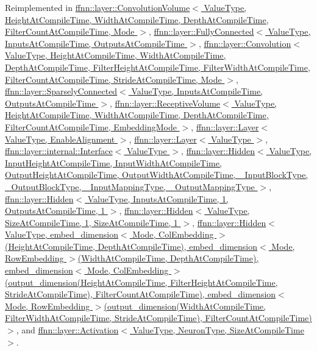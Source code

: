 Reimplemented in \hyperlink{classffnn_1_1layer_1_1_convolution_volume_a52d21f4ee6b841d154b1dc63bd3ed4bf}{ffnn\-::layer\-::\-Convolution\-Volume$<$ Value\-Type, Height\-At\-Compile\-Time, Width\-At\-Compile\-Time, Depth\-At\-Compile\-Time, Filter\-Count\-At\-Compile\-Time, Mode $>$}, \hyperlink{classffnn_1_1layer_1_1_fully_connected_a858f04f0752096d74e4d9876edb4c73e}{ffnn\-::layer\-::\-Fully\-Connected$<$ Value\-Type, Inputs\-At\-Compile\-Time, Outputs\-At\-Compile\-Time $>$}, \hyperlink{classffnn_1_1layer_1_1_convolution_a73b3701a644fe0ff1dad7c270fbf8ac6}{ffnn\-::layer\-::\-Convolution$<$ Value\-Type, Height\-At\-Compile\-Time, Width\-At\-Compile\-Time, Depth\-At\-Compile\-Time, Filter\-Height\-At\-Compile\-Time, Filter\-Width\-At\-Compile\-Time, Filter\-Count\-At\-Compile\-Time, Stride\-At\-Compile\-Time, Mode $>$}, \hyperlink{classffnn_1_1layer_1_1_sparsely_connected_aa8ae358e7cf06b58f3d33be2851d0260}{ffnn\-::layer\-::\-Sparsely\-Connected$<$ Value\-Type, Inputs\-At\-Compile\-Time, Outputs\-At\-Compile\-Time $>$}, \hyperlink{classffnn_1_1layer_1_1_receptive_volume_a9f813e0c5c60d572a296b8ec1fc25086}{ffnn\-::layer\-::\-Receptive\-Volume$<$ Value\-Type, Height\-At\-Compile\-Time, Width\-At\-Compile\-Time, Depth\-At\-Compile\-Time, Filter\-Count\-At\-Compile\-Time, Embedding\-Mode $>$}, \hyperlink{classffnn_1_1layer_1_1_layer_a5091f6ccef4d80254dd8caf72d13d136}{ffnn\-::layer\-::\-Layer$<$ Value\-Type, Enable\-Alignment $>$}, \hyperlink{classffnn_1_1layer_1_1_layer_a5091f6ccef4d80254dd8caf72d13d136}{ffnn\-::layer\-::\-Layer$<$ Value\-Type $>$}, \hyperlink{classffnn_1_1layer_1_1internal_1_1_interface_a417d6fda112fdffed8091b0ebd78ed97}{ffnn\-::layer\-::internal\-::\-Interface$<$ Value\-Type $>$}, \hyperlink{classffnn_1_1layer_1_1_hidden_a98305185267a0f7953f1b53c4bce4cf6}{ffnn\-::layer\-::\-Hidden$<$ Value\-Type, Input\-Height\-At\-Compile\-Time, Input\-Width\-At\-Compile\-Time, Output\-Height\-At\-Compile\-Time, Output\-Width\-At\-Compile\-Time, \-\_\-\-Input\-Block\-Type, \-\_\-\-Output\-Block\-Type, \-\_\-\-Input\-Mapping\-Type, \-\_\-\-Output\-Mapping\-Type $>$}, \hyperlink{classffnn_1_1layer_1_1_hidden_a98305185267a0f7953f1b53c4bce4cf6}{ffnn\-::layer\-::\-Hidden$<$ Value\-Type, Inputs\-At\-Compile\-Time, 1, Outputs\-At\-Compile\-Time, 1 $>$}, \hyperlink{classffnn_1_1layer_1_1_hidden_a98305185267a0f7953f1b53c4bce4cf6}{ffnn\-::layer\-::\-Hidden$<$ Value\-Type, Size\-At\-Compile\-Time, 1, Size\-At\-Compile\-Time, 1 $>$}, \hyperlink{classffnn_1_1layer_1_1_hidden_a98305185267a0f7953f1b53c4bce4cf6}{ffnn\-::layer\-::\-Hidden$<$ Value\-Type, embed\-\_\-dimension$<$ Mode, Col\-Embedding $>$(\-Height\-At\-Compile\-Time, Depth\-At\-Compile\-Time), embed\-\_\-dimension$<$ Mode, Row\-Embedding $>$(\-Width\-At\-Compile\-Time, Depth\-At\-Compile\-Time), embed\-\_\-dimension$<$ Mode, Col\-Embedding $>$(output\-\_\-dimension(\-Height\-At\-Compile\-Time, Filter\-Height\-At\-Compile\-Time, Stride\-At\-Compile\-Time), Filter\-Count\-At\-Compile\-Time), embed\-\_\-dimension$<$ Mode, Row\-Embedding $>$(output\-\_\-dimension(\-Width\-At\-Compile\-Time, Filter\-Width\-At\-Compile\-Time, Stride\-At\-Compile\-Time), Filter\-Count\-At\-Compile\-Time)$>$}, and \hyperlink{classffnn_1_1layer_1_1_activation_ab5525e49c08fc593856b9c95e0eba1ee}{ffnn\-::layer\-::\-Activation$<$ Value\-Type, Neuron\-Type, Size\-At\-Compile\-Time $>$}.
